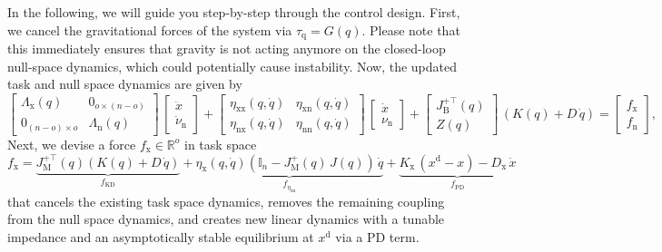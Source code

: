 In the following, we will guide you step-by-step through the control design.
First, we cancel the gravitational forces of the system via $\tau_\mathrm{q} = G(q)$. Please note that this immediately ensures that gravity is not acting anymore on the closed-loop null-space dynamics, which could potentially cause instability.
Now, the updated task and null space dynamics are given by
\begin{equation}
    \begin{bmatrix}
        \Lambda_\mathrm{x}(q) & 0_{o \times (n-o)}\\
        0_{(n-o) \times o} & \Lambda_\mathrm{n}(q)
    \end{bmatrix} \, \begin{bmatrix}
        \ddot{x}\\
        \dot{\nu}_\mathrm{n}
    \end{bmatrix} + \begin{bmatrix}
        \eta_\mathrm{xx}(q,\dot{q}) & \eta_\mathrm{xn}(q,\dot{q})\\
        \eta_\mathrm{nx}(q,\dot{q}) & \eta_\mathrm{nn}(q,\dot{q})
    \end{bmatrix} \, \begin{bmatrix}
        \dot{x}\\ \nu_\mathrm{n}
    \end{bmatrix} + \begin{bmatrix}
        J_\mathrm{B}^{+\top}(q)\\
        Z(q)
    \end{bmatrix} \, \left ( K(q) + D \, \dot{q} \right ) = \begin{bmatrix}
        f_\mathrm{x}\\ f_\mathrm{n}
    \end{bmatrix},
\end{equation}
Next, we devise a force $f_\mathrm{x} \in \mathbb{R}^o$ in task space
\begin{equation}
    f_\mathrm{x} = \underbrace{J_\mathrm{M}^{+\top}(q) \left ( K(q) + D \, \dot{q} \right )}_{f_\mathrm{KD}}
    + \underbrace{\eta_\mathrm{x}(q,\dot{q}) \left ( \mathbb{I}_n - J_\mathrm{M}^{+}(q) \, J(q)  \right ) \, \dot{q}}_{f_{\eta_\mathrm{xn}}}
    + \underbrace{K_\mathrm{x} \, (x^\mathrm{d} - x) - D_\mathrm{x} \, \dot{x}}_{f_\mathrm{PD}}
\end{equation}
that cancels the existing task space dynamics, removes the remaining coupling from the null space dynamics, and creates new linear dynamics with a tunable impedance and an asymptotically stable equilibrium at $x^\mathrm{d}$ via a PD term. 
